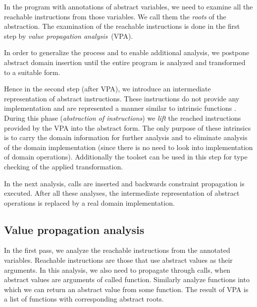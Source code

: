 In the program with annotations of abstract variables, we need to examine all the
reachable instructions from those variables. We call them the
\emph{roots} of the abstraction. The examination of the reachable instructions is
done in the first step by \emph{value propagation analysis}~(VPA).

In order to generalize the process and to enable additional analysis, we
postpone abstract domain insertion until the entire program is analyzed and
transformed to a suitable form.

Hence in the second step (after VPA), we introduce an intermediate representation of
abstract instructions. These instructions do not provide any implementation and
are represented a manner similar to \LLVM intrinsic functions
\cite{LLVM:langref}. During this phase (\emph{abstraction of instructions}) we
\emph{lift} the reached instructions provided by the VPA into the abstract form. The
only purpose of these intrinsics is to carry the domain information for further
analysis and to eliminate analysis of the domain implementation (since there is no need
to look into implementation of domain operations). Additionally the \LLVM
toolset can be used in this step for type checking of the applied transformation.

In the next analysis,  calls are inserted and backwards constraint
propagation is executed. After all these analyses, the intermediate
representation of abstract operations is replaced by a real domain
implementation.

\subsection{Value propagation analysis}
In the first \LLVM pass, we analyze the reachable instructions from the
annotated variables. Reachable instructions are those that use abstract values
as their arguments. In this analysis, we also need to propagate through calls,
when abstract values are arguments of called function. Similarly analyze
functions into which we can return an abstract value from some function. The
result of VPA is a list of functions with corresponding abstract roots.

